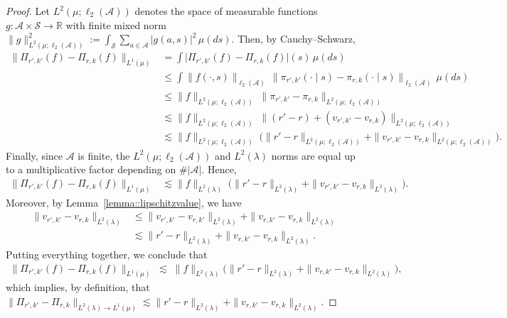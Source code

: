 \documentclass[11pt]{article}
\theoremstyle{plain}
\begin{document}
\begin{proof}
Let $L^2(\mu;\ell_2(\mathcal A))$ denotes the space of measurable functions  $g:\mathcal{A}\times\mathcal{S}\to\mathbb{R}$ with finite mixed norm $\|g\|_{L^2(\mu;\ell_2(\mathcal A))}^2
   := \int_{\mathcal S} \sum_{a\in\mathcal A} |g(a,s)|^2 \, \mu(ds).$ Then, by Cauchy--Schwarz,
\begin{align*}
\bigl\|\Pi_{r',k'}(f)-\Pi_{r,k}(f)\bigr\|_{L^1(\mu)}
&= \int \bigl|\Pi_{r',k'}(f)-\Pi_{r,k}(f)\bigr|(s)\, \mu(ds) \\
&\le \int \|f(\cdot,s)\|_{\ell_2(\mathcal A)} \,
        \|\pi_{r',k'}(\cdot\mid s)-\pi_{r,k}(\cdot\mid s)\|_{\ell_2(\mathcal A)}\,\mu(ds) \\
&\le \|f\|_{L^2(\mu;\ell_2(\mathcal A))}\;
    \|\pi_{r',k'}-\pi_{r,k}\|_{L^2(\mu;\ell_2(\mathcal A))} \\
&\lesssim \|f\|_{L^2(\mu;\ell_2(\mathcal A))}\;
    \|(r'-r)+(v_{r',k'}-v_{r,k})\|_{L^2(\mu;\ell_2(\mathcal A))} \\
&\lesssim \|f\|_{L^2(\mu;\ell_2(\mathcal A))}\;
   \Big( \|r'-r\|_{L^2(\mu;\ell_2(\mathcal A))}
       + \|v_{r',k'}-v_{r,k}\|_{L^2(\mu;\ell_2(\mathcal A))} \Big).
\end{align*}
Finally, since $\mathcal{A}$ is finite, the $L^2(\mu;\ell_2(\mathcal A))$ and $L^2(\lambda)$ norms are equal up to a multiplicative factor depending on $\# |\mathcal{A}|$. Hence,
\begin{align*}
\bigl\|\Pi_{r',k'}(f)-\Pi_{r,k}(f)\bigr\|_{L^1(\mu)} &\lesssim \|f\|_{L^2(\lambda)}\;
   \Big( \|r'-r\|_{L^2(\lambda)}
       + \|v_{r',k'}-v_{r,k}\|_{L^2(\lambda)} \Big).
\end{align*}
Moreover, by Lemma~\ref{lemma::lipschitzvalue}, we have
\begin{align*}
\|v_{r',k'}-v_{r,k}\|_{L^2(\lambda)}
&\leq \|v_{r',k'}-v_{r,k'}\|_{L^2(\lambda)} 
   + \|v_{r,k'}-v_{r,k}\|_{L^2(\lambda)} \\
&\lesssim \|r'-r\|_{L^2(\lambda)} 
   + \|v_{r,k'}-v_{r,k}\|_{L^2(\lambda)}.
\end{align*}
Putting everything together, we conclude that
\begin{align*}
\bigl\|\Pi_{r',k'}(f)-\Pi_{r,k}(f)\bigr\|_{L^1(\mu)}
   \;\lesssim\; \|f\|_{L^2(\lambda)}
   \Big( \|r'-r\|_{L^2(\lambda)}
       + \|v_{r,k'}-v_{r,k}\|_{L^2(\lambda)} \Big),
\end{align*}
which implies, by definition, that $\bigl\|\Pi_{r',k'}-\Pi_{r,k}\bigr\|_{L^2(\lambda) \rightarrow L^1(\mu)} \lesssim \|r'-r\|_{L^2(\lambda)}
       + \|v_{r,k'}-v_{r,k}\|_{L^2(\lambda)}$.


\end{proof}
\end{document}

